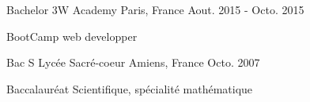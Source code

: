 

\begin{cventries}

  \cventry
    {Bachelor} %
    {3W Academy} %
    {Paris, France} %
    {Aout. 2015 - Octo. 2015} %
    {
      \begin{cvitems} %
        \item {BootCamp web developper}
      \end{cvitems}
    }

\cventry
{Bac S} %
{Lycée Sacré-coeur} %
{Amiens, France} %
{Octo. 2007} %
{
  \begin{cvitems} %
    \item {Baccalauréat Scientifique, spécialité mathématique}
  \end{cvitems}
}

\end{cventries}

